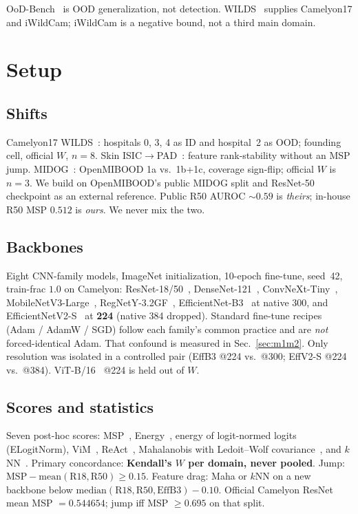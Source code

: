 \documentclass[10pt,twocolumn,letterpaper]{article}
\begin{document}
OoD-Bench~\cite{ye2022oodbench} is OOD generalization, not detection.
WILDS~\cite{koh2021wilds} supplies Camelyon17 and iWildCam; iWildCam is a negative bound, not a third main domain.

\section{Setup}

\subsection{Shifts}

Camelyon17 WILDS~\cite{koh2021wilds}: hospitals 0, 3, 4 as ID and hospital~2 as OOD; founding cell, official $W$, $n{=}8$.
Skin ISIC$\to$PAD~\cite{pacheco2020pad}: feature rank-stability without an MSP jump.
MIDOG~\cite{openmibood2025}: OpenMIBOOD 1a vs.\ 1b{+}1c, coverage sign-flip; official $W$ is $n{=}3$.
We build on OpenMIBOOD's public MIDOG split and ResNet-50 checkpoint as an external reference.
Public R50 AUROC ${\sim}0.59$ is \emph{theirs}; in-house R50 MSP $0.512$ is \emph{ours}. We never mix the two.

\subsection{Backbones}

Eight CNN-family models, ImageNet initialization, 10-epoch fine-tune, seed~42, train-frac $1.0$ on Camelyon: ResNet-18/50~\cite{he2016resnet}, DenseNet-121~\cite{huang2017densenet}, ConvNeXt-Tiny~\cite{liu2022convnext}, MobileNetV3-Large~\cite{howard2019mobilenetv3}, RegNetY-3.2GF~\cite{radosavovic2020regnet}, EfficientNet-B3~\cite{tan2019efficientnet} at native 300, and EfficientNetV2-S~\cite{tan2021efficientnetv2} at \textbf{224} (native 384 dropped).
Standard fine-tune recipes (Adam / AdamW / SGD) follow each family's common practice and are \emph{not} forced-identical Adam.
That confound is measured in Sec.~\ref{sec:m1m2}.
Only resolution was isolated in a controlled pair (EffB3 @224 vs.\ @300; EffV2-S @224 vs.\ @384).
ViT-B/16~\cite{dosovitskiy2021vit} @224 is held out of $W$.

\subsection{Scores and statistics}

Seven post-hoc scores: MSP~\cite{hendrycks2017baseline}, Energy~\cite{liu2020energy}, energy of logit-normed logits (ELogitNorm), ViM~\cite{wang2022vim}, ReAct~\cite{sun2021react}, Mahalanobis with Ledoit--Wolf covariance~\cite{lee2018mahalanobis,ledoit2004well}, and $k$NN~\cite{sun2022knn}.
Primary concordance: \textbf{Kendall's $W$ per domain, never pooled}.
Jump: $\mathrm{MSP}-\mathrm{mean}(\mathrm{R18},\mathrm{R50})\ge 0.15$.
Feature drag: Maha or $k$NN on a new backbone below $\mathrm{median}(\mathrm{R18},\mathrm{R50},\mathrm{EffB3})-0.10$.
Official Camelyon ResNet mean MSP ${=}0.544654$; jump iff MSP ${\ge}0.695$ on that split.
\end{document}
